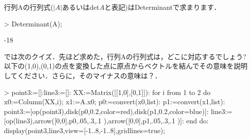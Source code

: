 行列Aの行列式($\left|A\right|$あるいはdet$A$と表記)はDeterminantで求まります．
\begin{MapleInput}
> Determinant(A);
\end{MapleInput}
\begin{MapleOutput}
-18
\end{MapleOutput}
では次のクイズ．先ほど求めた，行列Aの行列式は，どこに対応するでしょう?
以下の(1,0),(0,1)の点を変換した点に原点からベクトルを結んでその意味を説明してください．さらに，そのマイナスの意味は？．
\begin{MapleInput}
> point3:=[]:line3:=[]: XX:=Matrix([[1,0],[0,1]]): 
  for i from 1 to 2 do
    x0:=Column(XX,i); x1:=A.x0; 
    p0:=convert(x0,list): 
    p1:=convert(x1,list):
    point3:=[op(point3),disk(p0,0.2,color=red),disk(p1,0.2,color=blue)]:
    line3:=[op(line3),arrow([0,0],p0,.05,.3,.1 ),arrow([0,0],p1,.05,.3,.1 )]:
  end do:
  display(point3,line3,view=[-1..8,-1..8],gridlines=true);
\end{MapleInput}
